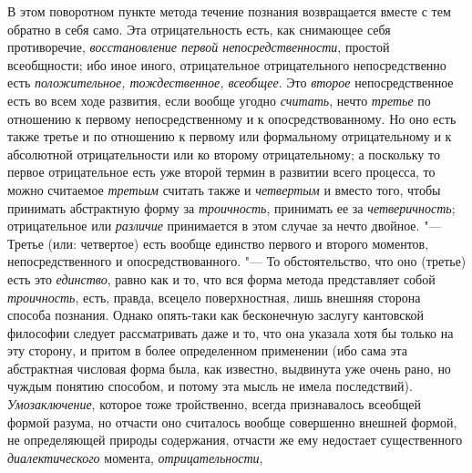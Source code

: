{{В этом поворотном пункте метода течение познания возвращается
вместе с тем обратно в себя само. Эта отрицательность есть, как снимающее
себя противоречие, {\em восстановление
первой непосредственности}, простой всеобщности; ибо иное
иного, отрицательное отрицательного непосредственно есть
{\em положительное, тождественное, всеобщее}. Это {\em второе}
непосредственное есть во всем ходе развития, если вообще угодно {\em считать},
нечто {\em третье} по отношению к первому непосредственному и к
опосредствованному. Но оно есть также третье и по отношению к первому или
формальному отрицательному и к абсолютной отрицательности или ко второму
отрицательному; а поскольку то первое отрицательное есть уже второй термин
в развитии всего процесса, то можно считаемое {\em третьим} считать
также и {\em четвертым} и вместо того, чтобы принимать абстрактную форму за
{\em троичность}, принимать ее за {\em четверичность}; отрицательное или
{\em различие} принимается в этом случае за нечто двойное. "---
Третье (или: четвертое) есть вообще единство первого и
второго моментов, непосредственного и опосредствованного. "---
То обстоятельство, что оно (третье) есть это {\em единство}, равно как
и то, что вся форма метода представляет собой {\em троичность}, есть,
правда, всецело поверхностная, лишь внешняя сторона способа познания.
Однако опять-таки как бесконечную заслугу кантовской
философии
следует рассматривать даже и то, что она указала хотя бы
только на эту сторону, и притом в более определенном применении (ибо сама
эта абстрактная числовая форма была, как известно, выдвинута уже очень
рано, но чуждым понятию способом, и потому эта мысль не имела последствий).
{\em Умозаключение},
которое тоже тройственно, всегда признавалось всеобщей формой
разума, но отчасти оно считалось вообще совершенно внешней формой, не
определяющей природы содержания, отчасти же ему недостает существенного
{\em диалектического} момента, {\em отрицательности},
}}
